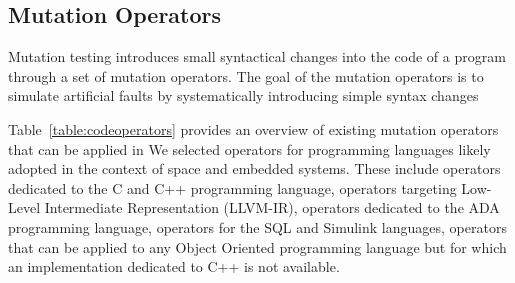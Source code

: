 
\subsection{Mutation Operators}
\label{sec:operators}

Mutation testing introduces small syntactical changes into the code of a program 
through a set of mutation operators.
The goal of the mutation operators is to simulate artificial faults by systematically introducing  simple syntax changes 


Table~\ref{table:codeoperators} provides an overview of existing mutation operators that can be applied in 
We selected operators for programming languages likely adopted in the context of space and embedded systems. These include operators dedicated to the C and C++ programming language, operators targeting Low-Level Intermediate Representation (LLVM-IR), operators dedicated to the ADA programming language, operators for the SQL and Simulink languages, operators that can be applied to any Object Oriented programming language but for which an implementation dedicated to C++ is not available.

